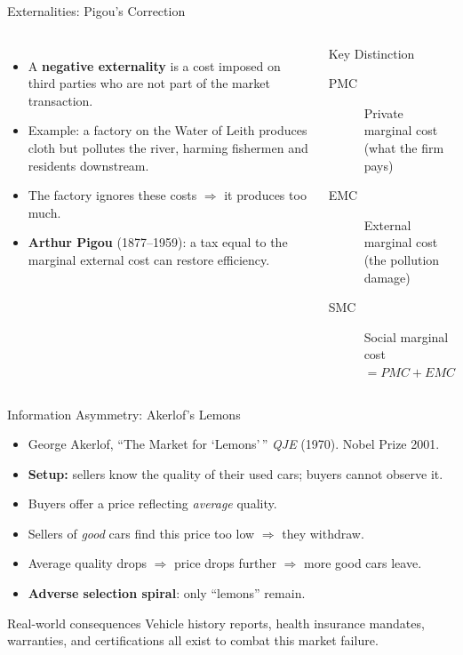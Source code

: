 \documentclass[aspectratio=169, 10pt]{beamer}
\begin{document}
\begin{frame}{Externalities: Pigou's Correction}
\begin{columns}[T]
\begin{itemize}
  \item A \textbf{negative externality} is a cost imposed on third parties
        who are not part of the market transaction.
  \item Example: a factory on the Water of Leith produces cloth but
        pollutes the river, harming fishermen and residents downstream.
  \item The factory ignores these costs $\Rightarrow$ it produces
        \alert{too much}.
  \item \textbf{Arthur Pigou} (1877--1959): a tax equal to the marginal
        external cost can restore efficiency.
\end{itemize}
\begin{block}{Key Distinction}
\begin{description}
  \item[PMC] Private marginal cost\\(what the firm pays)
  \item[EMC] External marginal cost\\(the pollution damage)
  \item[SMC] Social marginal cost\\$= PMC + EMC$
\end{description}
\end{block}
\end{columns}
\end{frame}

\begin{frame}{Information Asymmetry: Akerlof's Lemons}
\begin{itemize}
  \item George Akerlof, ``The Market for `Lemons'\,'' \textit{QJE} (1970).
        Nobel Prize 2001.
  \item \textbf{Setup:} sellers know the quality of their used cars;
        buyers cannot observe it.
  \item Buyers offer a price reflecting \textit{average} quality.
  \item Sellers of \textit{good} cars find this price too low
        $\Rightarrow$ they \alert{withdraw}.
  \item Average quality drops $\Rightarrow$ price drops further
        $\Rightarrow$ more good cars leave.
  \item \textbf{Adverse selection spiral}: only ``lemons'' remain.
\end{itemize}
\vspace{0.5em}
\begin{alertblock}{Real-world consequences}
Vehicle history reports, health insurance mandates, warranties,
and certifications all exist to combat this market failure.
\end{alertblock}
\end{frame}
\end{document}
